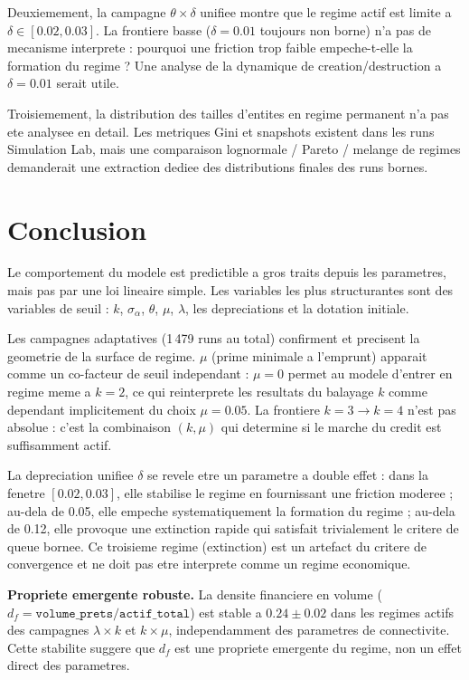\documentclass[11pt,a4paper]{article}
\begin{document}
Deuxiemement, la campagne \(\theta\times\delta\) unifiee montre que le regime
actif est limite a \(\delta \in [0.02, 0.03]\). La frontiere basse (\(\delta=0.01\)
toujours non borne) n'a pas de mecanisme interprete : pourquoi une friction trop
faible empeche-t-elle la formation du regime ? Une analyse de la dynamique de
creation/destruction a \(\delta=0.01\) serait utile.

Troisiemement, la distribution des tailles d'entites en regime permanent
n'a pas ete analysee en detail. Les metriques Gini et snapshots existent dans
les runs Simulation Lab, mais une comparaison lognormale / Pareto / melange
de regimes demanderait une extraction dediee des distributions finales des
runs bornes.

\section{Conclusion}

Le comportement du modele est predictible a gros traits depuis les parametres,
mais pas par une loi lineaire simple. Les variables les plus structurantes sont
des variables de seuil : \(k\), \(\sigma_\alpha\), \(\theta\), \(\mu\),
\(\lambda\), les depreciations et la dotation initiale.

Les campagnes adaptatives (1\,479 runs au total) confirment et precisent
la geometrie de la surface de regime.
\(\mu\) (prime minimale a l'emprunt) apparait comme un co-facteur de seuil
independant : \(\mu=0\) permet au modele d'entrer en regime meme a \(k=2\),
ce qui reinterprete les resultats du balayage \(k\) comme dependant implicitement
du choix \(\mu=0.05\). La frontiere \(k=3 \to k=4\) n'est pas absolue :
c'est la combinaison \((k, \mu)\) qui determine si le marche du credit est
suffisamment actif.

La depreciation unifiee \(\delta\) se revele etre un parametre a double effet :
dans la fenetre \([0.02, 0.03]\), elle stabilise le regime en fournissant une
friction moderee ; au-dela de 0.05, elle empeche systematiquement la formation
du regime ; au-dela de 0.12, elle provoque une extinction rapide qui satisfait
trivialement le critere de queue bornee. Ce troisieme regime (extinction) est
un artefact du critere de convergence et ne doit pas etre interprete comme
un regime economique.

\textbf{Propriete emergente robuste.}
La densite financiere en volume (\(d_f = \texttt{volume\_prets}/\texttt{actif\_total}\))
est stable a \(0.24 \pm 0.02\) dans les regimes actifs des campagnes \(\lambda\times k\)
et \(k\times\mu\), independamment des parametres de connectivite. Cette stabilite
suggere que \(d_f\) est une propriete emergente du regime, non un effet direct
des parametres.
\end{document}
